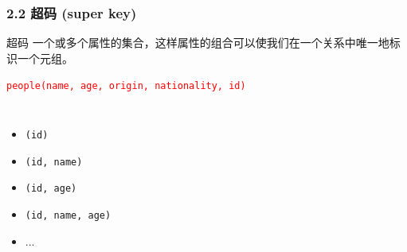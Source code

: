 \documentclass[aspectratio=169, 14pt]{beamer}
\begin{document}
\begin{frame}
    \frametitle{2.2 超码 (super key)}
\begin{exampleblock}{超码}
    一个或多个属性的集合，这样属性的组合可以使我们在一个关系中唯一地标识一个元组。
\end{exampleblock}    
\textcolor{red}{\texttt{people(name, age, origin, nationality, id)}}
\pause
\begin{columns}
    \begin{itemize}
        \item \texttt{(id)}
        \item \texttt{(id, name)}
        \item \texttt{(id, age)}
        \item \texttt{(id, name, age)}
        \item ...
    \end{itemize} 
\end{columns}
\end{frame}
\end{document}
